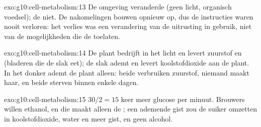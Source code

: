 \begin{solution}{exo:g10:cell-metabolism:13}
De omgeving veranderde (geen licht, organisch voedsel); de  niet.
De nakomelingen bouwen  opnieuw op, dus de instructies
waren nooit verloren: het verlies was een verandering van de uitrusting
in gebruik, niet van de mogelijkheden die de  toelaten.
\end{solution}

\begin{solution}{exo:g10:cell-metabolism:14}
De plant bedrijft in het licht  en levert zuurstof en
 (bladeren die de slak eet); de slak ademt en levert
koolstofdioxide aan de plant. In het donker ademt de plant alleen:
beide verbruiken zuurstof, niemand maakt haar, en beide sterven binnen
enkele dagen.
\end{solution}

\begin{solution}{exo:g10:cell-metabolism:15}
$30/2 = 15$ keer meer glucose per minuut. Brouwers willen ethanol, en
die maakt alleen de ; een ademende gist zou de suiker omzetten in
koolstofdioxide, water en meer gist, en geen alcohol.
\end{solution}

